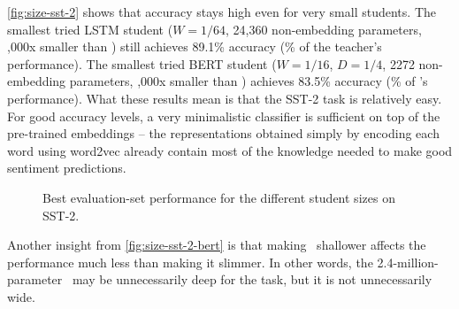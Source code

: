 {{{      \autoref{fig:size-sst-2} shows that accuracy stays high even for very small students. 
      The smallest tried LSTM student ($W=1/64$, 24,360 non-embedding parameters, ,000x smaller than \BERTT) still achieves 89.1\% accuracy (\% of the teacher's performance).
      The smallest tried BERT student ($W=1/16$, $D=1/4$, 2272 non-embedding parameters, ,000x smaller than \BERTT) achieves 83.5\% accuracy (\% of \BERTT's performance).
      What these results mean is that the SST-2 task is relatively easy. 
      For good accuracy levels, a very minimalistic classifier is sufficient on top of the pre-trained embeddings -- the representations obtained simply by encoding each word using word2vec already contain most of the knowledge needed to make good sentiment predictions.

      \begin{figure}
      \caption{Best evaluation-set performance for the different student sizes on SST-2.}
      \label{fig:size-sst-2}
      \end{figure}
      Another insight from \autoref{fig:size-sst-2-bert} is that making \BERTS~shallower affects the performance much less than making it slimmer. In other words, the 2.4-million-parameter \BERTS~may be unnecessarily deep for the task, but it is not unnecessarily wide.
    }

}}
